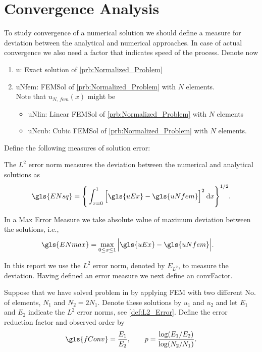 \section{Convergence Analysis}
To study convergence of a numerical solution we should define a measure for deviation between the analytical and numerical
approaches. In case of actual convergence we also need a factor that indicates speed of the process. Denote now
\begin{enumerate}
	\item \gls{u}: Exact solution of \cref{prb:Normalized_Problem}
	\item \gls{uNfem}: \Gls{FEMSol} of \cref{prb:Normalized_Problem} with $N$ elements. \\
				Note that $u_{N, \, fem}\left( x \right)$ might be
	\begin{itemize}
		\item \gls{uNlin}: Linear \gls{FEMSol} of \cref{prb:Normalized_Problem} with $N$ elements
		\item \gls{uNcub}: Cubic \gls{FEMSol} of \cref{prb:Normalized_Problem} with $N$ elements.
	\end{itemize}
\end{enumerate}
Define the following measures of solution error:
\begin{definition} \label{def:L2_Error}
	The $L^2$ error norm measures the deviation between the numerical and analytical solutions as
	\begin{equation}	\label{eqn:L2_Error}
		\gls{ENsq} = \Bigg\{ \int_{x=0}^{1}\Big[ \gls{uEx} - \gls{uNfem} \Big] ^{2} \dd x \Bigg\}^{1/2}.
	\end{equation}
\end{definition}
%
\begin{definition}	\label{def:Max_Error}
	In a Max Error Measure we take absolute value of maximum deviation between the solutions, i.e.,
	\begin{align}	\label{eqn:Max_Error}
		\gls{ENmax} &= \max_{ 0 \leq x \leq 1 } \Big \vert  \gls{uEx} - \gls{uNfem} \Big \vert.
	\end{align}
\end{definition}
In this report we use the $L^2$ error norm, denoted by $E_{L^2}$, to measure the deviation. Having defined an error measure we next define an
\gls{convFactor}.
%
\begin{definition} \label{def:Conv_Factor}
	Suppose that we have solved problem in  by applying \gls{FEM} with two different No.
	of elements, $N_{1}$ and $N_{2} = 2N_{1}$. Denote these solutions by $u_{1}$ and $u_{2}$ and let $E_{1}$
	and $E_{2}$ indicate the $L^2$ error norms, see \cref{def:L2_Error}. Define the error reduction factor and observed order by
	\begin{equation} \label{eqn:Conv_Factor}
		\gls{fConv} = \frac{E_{1}}{E_{2}},
		\qquad
		p = \frac{\log(E_{1}/E_{2})}{\log(N_{2}/N_{1})}.
	\end{equation}
\end{definition}
